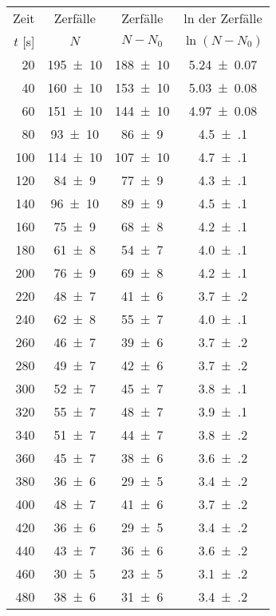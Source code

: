 \begin{table}[!h]
	\centering
	\begin{tabular}{|r|c|c|c|}
		\hline
		Zeit & Zerfälle & Zerfälle & ln der Zerfälle\\
		$t$ [\si{\second}] & $N$ & $N - N_{0}$ & $\ln(N - N_{0})$\\
\hline\hline
		\num{20} & \num{195(10)} & \num{188(10)} & \num{5.24(7)}\\
		\num{40} & \num{160(10)} & \num{153(10)} & \num{5.03(8)}\\
		\num{60} & \num{151(10)} & \num{144(10)} & \num{4.97(8)}\\
		\num{80} & \num{93(10)} & \num{86(9)} & \num{4.5(1)}\\
		\num{100} & \num{114(10)} & \num{107(10)} & \num{4.7(1)}\\
		\num{120} & \num{84(9)} & \num{77(9)} & \num{4.3(1)}\\
		\num{140} & \num{96(10)} & \num{89(9)} & \num{4.5(1)}\\
		\num{160} & \num{75(9)} & \num{68(8)} & \num{4.2(1)}\\
		\num{180} & \num{61(8)} & \num{54(7)} & \num{4.0(1)}\\
		\num{200} & \num{76(9)} & \num{69(8)} & \num{4.2(1)}\\
		\num{220} & \num{48(7)} & \num{41(6)} & \num{3.7(2)}\\
		\num{240} & \num{62(8)} & \num{55(7)} & \num{4.0(1)}\\
		\num{260} & \num{46(7)} & \num{39(6)} & \num{3.7(2)}\\
		\num{280} & \num{49(7)} & \num{42(6)} & \num{3.7(2)}\\
		\num{300} & \num{52(7)} & \num{45(7)} & \num{3.8(1)}\\
		\num{320} & \num{55(7)} & \num{48(7)} & \num{3.9(1)}\\
		\num{340} & \num{51(7)} & \num{44(7)} & \num{3.8(2)}\\
		\num{360} & \num{45(7)} & \num{38(6)} & \num{3.6(2)}\\
		\num{380} & \num{36(6)} & \num{29(5)} & \num{3.4(2)}\\
		\num{400} & \num{48(7)} & \num{41(6)} & \num{3.7(2)}\\
		\num{420} & \num{36(6)} & \num{29(5)} & \num{3.4(2)}\\
		\num{440} & \num{43(7)} & \num{36(6)} & \num{3.6(2)}\\
		\num{460} & \num{30(5)} & \num{23(5)} & \num{3.1(2)}\\
		\num{480} & \num{38(6)} & \num{31(6)} & \num{3.4(2)}\\

\end{tabular}
\end{table}
